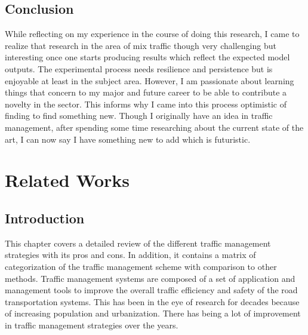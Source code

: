 \documentclass{book}
\begin{document}
\section{Conclusion}
While reflecting on my experience in the course of doing this research, I came to realize that research in the area of mix traffic though very challenging but interesting once one starts producing results which reflect the expected model outputs. The experimental process needs resilience and persistence but is enjoyable at least in the subject area. However, I am passionate about learning things that concern to my major and future career to be able to contribute a novelty in the sector. This informs why I came into this process optimistic of finding to find something new. Though I originally have an idea in traffic management, after spending some time researching about the current state of the art, I can now say I have something new to add which is futuristic.


\chapter{Related Works}

\section{Introduction}
This chapter covers a detailed review of the different traffic management strategies with its pros and cons. In addition, it contains a matrix of categorization of the traffic management scheme with comparison to other methods.  Traffic management systems are composed of a set of application and management tools to improve the overall traffic efficiency and safety of the road  transportation systems. This has been in the eye of research for decades because of increasing population and urbanization. There has being a lot of improvement in traffic management strategies over the years.\\
\end{document}
